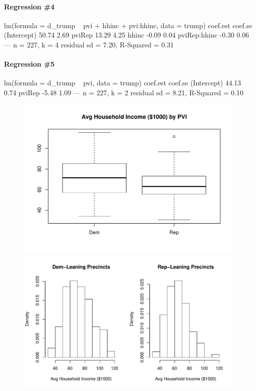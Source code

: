 \documentclass[addpoints,12pt]{exam}
\begin{document}
\begin{questions}
\paragraph{\footnotesize Regression \#4}
\begin{boxedverbatim}
lm(formula = d_trump ~ pvi + hhinc + pvi:hhinc, data = trump)
             coef.est coef.se
(Intercept)  50.74     2.69  
pviRep       13.29     4.25  
hhinc        -0.09     0.04  
pviRep:hhinc -0.30     0.06  
---
n = 227, k = 4
residual sd = 7.20, R-Squared = 0.31
\end{boxedverbatim}
\vspace{-1em}

\paragraph{\footnotesize Regression \#5}
\begin{boxedverbatim}
lm(formula = d_trump ~ pvi, data = trump)
            coef.est coef.se
(Intercept) 44.13     0.74  
pviRep      -5.48     1.09  
---
n = 227, k = 2
residual sd = 8.21, R-Squared = 0.10
\end{boxedverbatim}

\newpage
\begin{figure}[h]
  \centering
  \includegraphics[scale=0.75]{final_May_2016_boxplot}\\
  \vspace{1em}
  \includegraphics[scale=0.75]{final_May_2016_histograms}
\end{figure}

\end{questions}
\end{document}
